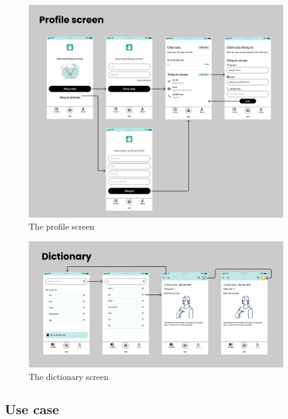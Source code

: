 \begin{figure}[H]
	\centering
	\includegraphics[width=\textwidth]{img/Chap5/Profile_screen.png}
	\caption{The profile screen}
\end{figure}

\begin{figure}[H]
	\centering
	\includegraphics[width=\textwidth]{img/Chap4/Dictionary.png}
	\caption{The dictionary screen}
\end{figure}





\newpage
\subsection{Use case}

